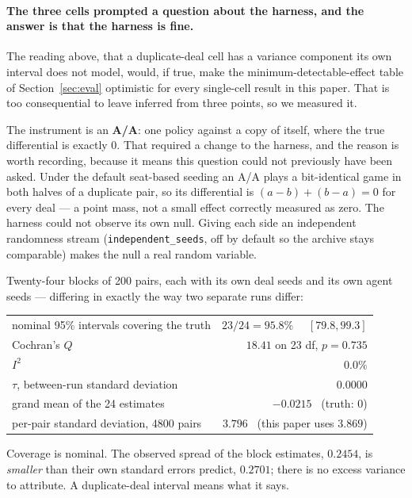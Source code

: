 \documentclass[11pt,letterpaper]{article}
\begin{document}
\paragraph{The three cells prompted a question about the harness, and the
answer is that the harness is fine.} The reading above, that a duplicate-deal
cell has a variance component its own interval does not model, would, if true,
make the minimum-detectable-effect table of Section~\ref{sec:eval} optimistic for
every single-cell result in this paper. That is too consequential to leave
inferred from three points, so we measured it.

The instrument is an \textbf{A/A}: one policy against a copy of itself, where the
true differential is exactly $0$. That required a change to the harness, and the
reason is worth recording, because it means this question could not previously
have been asked. Under the default seat-based seeding an A/A plays a
bit-identical game in both halves of a duplicate pair, so its differential is
$(a-b) + (b-a) = 0$ for every deal --- a point mass, not a small effect correctly
measured as zero. The harness could not observe its own null. Giving each side an
independent randomness stream (\texttt{independent\_seeds}, off by default so the
archive stays comparable) makes the null a real random variable.

Twenty-four blocks of 200 pairs, each with its own deal seeds and its own agent
seeds --- differing in exactly the way two separate runs differ:

\begin{center}
\begin{tabular}{lr}
\toprule
nominal 95\% intervals covering the truth & $23/24 = 95.8\%$ \ \ $[79.8, 99.3]$ \\
Cochran's $Q$ & $18.41$ on 23 df, $p = 0.735$ \\
$I^2$ & $0.0\%$ \\
$\tau$, between-run standard deviation & $\mathbf{0.0000}$ \\
grand mean of the 24 estimates & $-0.0215$ \ (truth: $0$) \\
per-pair standard deviation, 4800 pairs & $3.796$ \ (this paper uses $3.869$) \\
\bottomrule
\end{tabular}
\end{center}

Coverage is nominal. The observed spread of the block estimates, $0.2454$, is
\emph{smaller} than their own standard errors predict, $0.2701$; there is no
excess variance to attribute. A duplicate-deal interval means what it says.
\end{document}
